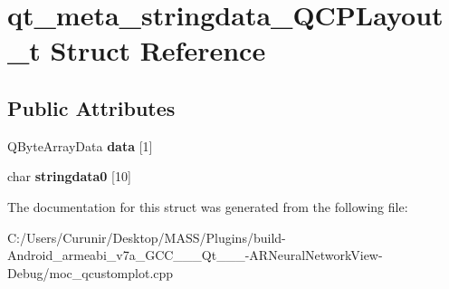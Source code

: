 \hypertarget{structqt__meta__stringdata___q_c_p_layout__t}{}\section{qt\+\_\+meta\+\_\+stringdata\+\_\+\+Q\+C\+P\+Layout\+\_\+t Struct Reference}
\label{structqt__meta__stringdata___q_c_p_layout__t}
\subsection*{Public Attributes}
\begin{DoxyCompactItemize}
\item 
\mbox{\label{structqt__meta__stringdata___q_c_p_layout__t_a0253032448489eab6700bc478b5aaf26}} 
Q\+Byte\+Array\+Data {\bfseries data} \mbox{[}1\mbox{]}
\item 
\mbox{\label{structqt__meta__stringdata___q_c_p_layout__t_a6dfd5cb53e45fd9cc401b767c7b4df07}} 
char {\bfseries stringdata0} \mbox{[}10\mbox{]}
\end{DoxyCompactItemize}


The documentation for this struct was generated from the following file\+:\begin{DoxyCompactItemize}
\item 
C\+:/\+Users/\+Curunir/\+Desktop/\+M\+A\+S\+S/\+Plugins/build-\/\+Android\+\_\+armeabi\+\_\+v7a\+\_\+\+G\+C\+C\+\_\+\_\+\_\+\+Qt\+\_\+\_\+\_-\/\+A\+R\+Neural\+Network\+View-\/\+Debug/moc\+\_\+qcustomplot.\+cpp\end{DoxyCompactItemize}
